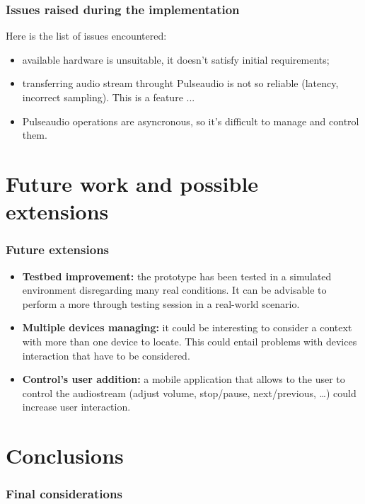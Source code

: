 \documentclass{beamer}
\begin{document}
	\begin{frame}
		\frametitle{Issues raised during the implementation}
		Here is the list of issues encountered:
		\begin{itemize}
		\item available hardware is unsuitable, it doesn't satisfy initial requirements;
		\item transferring audio stream throught Pulseaudio is not so reliable (latency, incorrect sampling). This is a feature ...
		\item Pulseaudio operations are asyncronous, so it's difficult to manage and control them.
		\end{itemize}
	\end{frame}
	

\section{Future work and possible extensions}

	
	\begin{frame}
		\frametitle{Future extensions}
		\begin{itemize}
		\item \textbf{Testbed improvement:} the prototype has been tested in a simulated environment disregarding many real conditions. It can be advisable to perform a more through testing session in a real-world scenario. 
		\pause
		\item \textbf{Multiple devices managing:} it could be interesting to consider a context with more than one device to locate. This could entail problems with devices interaction that have to be considered.
		\pause
		\item \textbf{Control's user addition:} a mobile application that allows to the user to control the audiostream (adjust volume, stop/pause, next/previous, \ldots) could increase user interaction.
		\end{itemize}
	\end{frame}
	

\section{Conclusions}
	\begin{frame}
		\frametitle{Final considerations}
	\end{frame}
\end{document}
